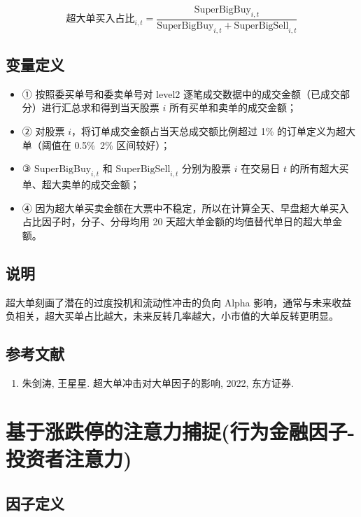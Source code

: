 \documentclass{article}
\begin{document}
\begin{equation}
    \text{超大单买入占比}_{i,t} = \frac{\mathrm{SuperBigBuy}_{i,t}}{\mathrm{SuperBigBuy}_{i,t} + \mathrm{SuperBigSell}_{i,t}}
\end{equation}

\subsection{变量定义}
\begin{itemize}
    \item ① 按照委买单号和委卖单号对 level2 逐笔成交数据中的成交金额（已成交部分）进行汇总求和得到当天股票 \( i \) 所有买单和卖单的成交金额；
    \item ② 对股票 \( i \)，将订单成交金额占当天总成交额比例超过 1\% 的订单定义为超大单（阈值在 0.5\%~2\% 区间较好）；
    \item ③ \( \mathrm{SuperBigBuy}_{i,t} \) 和 \( \mathrm{SuperBigSell}_{i,t} \) 分别为股票 \( i \) 在交易日 \( t \) 的所有超大买单、超大卖单的成交金额；
    \item ④ 因为超大单买卖金额在大票中不稳定，所以在计算全天、早盘超大单买入占比因子时，分子、分母均用 20 天超大单金额的均值替代单日的超大单金额。
\end{itemize}

\subsection{说明}
超大单刻画了潜在的过度投机和流动性冲击的负向 Alpha 影响，通常与未来收益负相关，超大买单占比越大，未来反转几率越大，小市值的大单反转更明显。

\subsection{参考文献}
\begin{enumerate}
    \item 朱剑涛, 王星星. 超大单冲击对大单因子的影响, 2022, 东方证券.
\end{enumerate}

\section{基于涨跌停的注意力捕捉(行为金融因子-投资者注意力)}

\subsection{因子定义}
\end{document}
